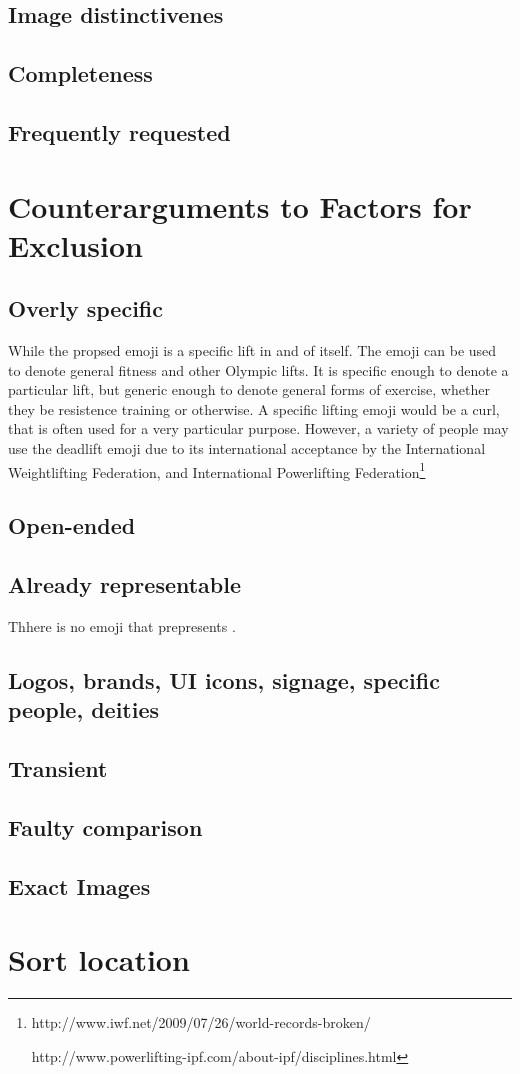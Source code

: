 \documentclass{article}
\begin{document}
\subsection{Image distinctivenes}
\subsection{Completeness}
\subsection{Frequently requested}

\section{Counterarguments to Factors for Exclusion}
\subsection{Overly specific}
While the propsed emoji \emojiname{} is a specific lift in and of itself. The emoji can be used to denote general fitness and other Olympic lifts. It is specific enough to denote 
a particular lift, but generic enough to denote general forms of exercise, whether they be resistence training or otherwise. A specific lifting emoji would be a curl, that is often
used for a very particular purpose. However, a variety of people may use the deadlift emoji due to its international acceptance by the International Weightlifting Federation, and International Powerlifting Federation\footnote{http://www.iwf.net/2009/07/26/world-records-broken/

http://www.powerlifting-ipf.com/about-ipf/disciplines.html
}

\subsection{Open-ended}
\subsection{Already representable}
Thhere is no emoji that prepresents \emojiname{}.

\subsection{Logos, brands, UI icons, signage, specific people, deities}
\subsection{Transient}
\subsection{Faulty comparison}
\subsection{Exact Images}

\section{Sort location}
\end{document}
